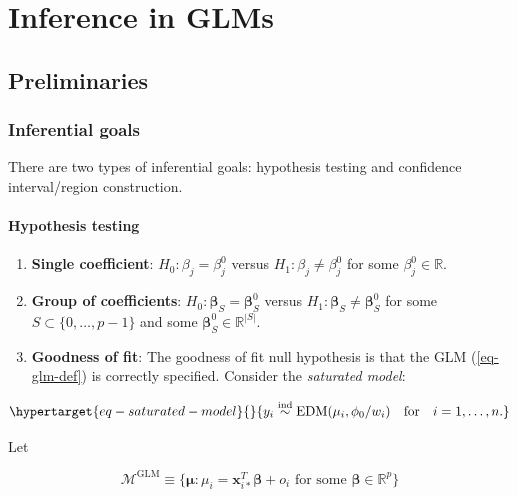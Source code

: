 \documentclass[
  11pt,
  letterpaper,
  oneside]{book}
\providecommand{\tightlist}{%
  \setlength{\itemsep}{0pt}\setlength{\parskip}{0pt}}\usepackage{longtable,booktabs,array}
\theoremstyle{definition}
\theoremstyle{plain}
\theoremstyle{plain}
\theoremstyle{plain}
\theoremstyle{remark}
\begin{document}
\hypertarget{sec-glm-inf}{%
\chapter{Inference in GLMs}\label{sec-glm-inf}}

\hypertarget{sec-preliminaries}{%
\section{Preliminaries}\label{sec-preliminaries}}

\hypertarget{sec-inferential-goals}{%
\subsection{Inferential goals}\label{sec-inferential-goals}}

There are two types of inferential goals: hypothesis testing and
confidence interval/region construction.

\hypertarget{sec-hypothesis-testing}{%
\subsubsection{Hypothesis testing}\label{sec-hypothesis-testing}}

\begin{enumerate}
\def\labelenumi{\arabic{enumi}.}
\tightlist
\item
  \textbf{Single coefficient}: \(H_0: \beta_j = \beta_j^0\) versus
  \(H_1: \beta_j \neq \beta_j^0\) for some \(\beta_j^0 \in \mathbb{R}\).
\item
  \textbf{Group of coefficients}:
  \(H_0: \boldsymbol{\beta}_S = \boldsymbol{\beta}_S^0\) versus
  \(H_1: \boldsymbol{\beta}_S \neq \boldsymbol{\beta}_S^0\) for some
  \(S \subset \{0,\dots,p-1\}\) and some
  \(\boldsymbol{\beta}_S^0 \in \mathbb{R}^{|S|}\).
\item
  \textbf{Goodness of fit}: The goodness of fit null hypothesis is that
  the GLM (\ref{eq-glm-def}) is correctly specified. Consider the
  \emph{saturated model}:
\end{enumerate}

\begin{equation}\protect\hypertarget{eq-saturated-model}{}{
y_i \overset{\text{ind}} \sim \text{EDM}(\mu_i, \phi_0/w_i) \quad \text{for} \quad i = 1,\dots,n.
}\label{eq-saturated-model}\end{equation}

Let

\[
\mathcal{M}^{\text{GLM}} \equiv \{\boldsymbol{\mu}: \mu_i = \boldsymbol{x}_{i*}^T \boldsymbol{\beta} + o_i \text{ for some } \boldsymbol{\beta} \in \mathbb{R}^p\}
\]
\end{document}
